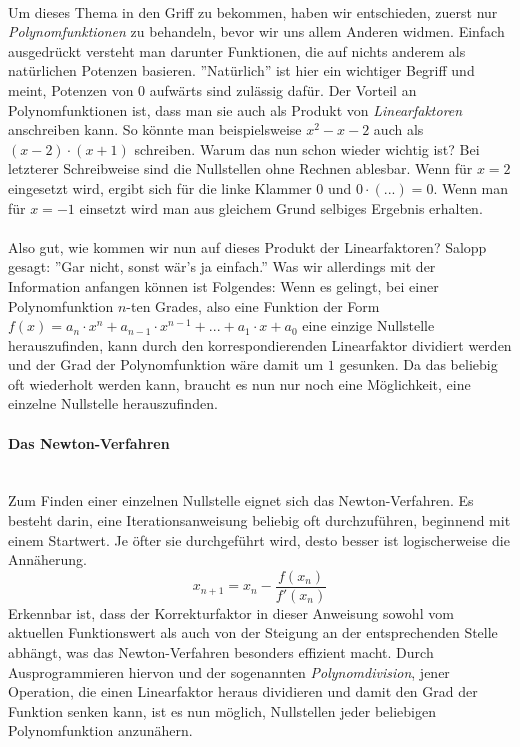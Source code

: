 \\
Um dieses Thema in den Griff zu bekommen, haben wir entschieden, zuerst nur \textit{Polynomfunktionen} zu behandeln, bevor wir uns allem Anderen widmen. Einfach ausgedrückt versteht man darunter Funktionen, die auf nichts anderem als natürlichen Potenzen basieren. ''Natürlich'' ist hier ein wichtiger Begriff und meint, Potenzen von $0$ aufwärts sind zulässig dafür. Der Vorteil an Polynomfunktionen ist, dass man sie auch als Produkt von \textit{Linearfaktoren} anschreiben kann. So könnte man beispielsweise $x^2-x-2$ auch als $(x-2) \cdot (x+1)$ schreiben. Warum das nun schon wieder wichtig ist? Bei letzterer Schreibweise sind die Nullstellen ohne Rechnen ablesbar. Wenn für $x=2$ eingesetzt wird, ergibt sich für die linke Klammer $0$ und $0 \cdot (...)=0$. Wenn man für $x=-1$ einsetzt wird man aus gleichem Grund selbiges Ergebnis erhalten.\\
\\
Also gut, wie kommen wir nun auf dieses Produkt der Linearfaktoren? Salopp gesagt: ''Gar nicht, sonst wär's ja einfach.'' Was wir allerdings mit der Information anfangen können ist Folgendes: Wenn es gelingt, bei einer Polynomfunktion $n$-ten Grades, also eine Funktion der Form $f(x)=a_n \cdot x^n + a_{n-1} \cdot x^{n-1} + ... + a_1 \cdot x + a_0$ eine einzige Nullstelle herauszufinden, kann durch den korrespondierenden Linearfaktor dividiert werden und der Grad der Polynomfunktion wäre damit um $1$ gesunken. Da das beliebig oft wiederholt werden kann, braucht es nun nur noch eine Möglichkeit, eine einzelne Nullstelle herauszufinden.

\setcounter{secnumdepth}{4}
\paragraph{Das Newton-Verfahren}\ \\
Zum Finden einer einzelnen Nullstelle eignet sich das Newton-Verfahren. Es besteht darin, eine Iterationsanweisung beliebig oft durchzuführen, beginnend mit einem Startwert. Je öfter sie durchgeführt wird, desto besser ist logischerweise die Annäherung.\\
\[ x_{n+1}=x_{n}-{\frac {f(x_{n})}{f'(x_{n})}}\]
\noindent
Erkennbar ist, dass der Korrekturfaktor in dieser Anweisung sowohl vom aktuellen Funktionswert als auch von der Steigung an der entsprechenden Stelle abhängt, was das Newton-Verfahren besonders effizient macht. Durch Ausprogrammieren hiervon und der sogenannten \textit{Polynomdivision}, jener Operation, die einen Linearfaktor heraus dividieren und damit den Grad der Funktion senken kann, ist es nun möglich, Nullstellen jeder beliebigen Polynomfunktion anzunähern.

